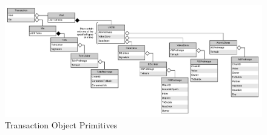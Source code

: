 \begin{figure}[H]
    \centering
    \includegraphics[scale=0.5]{figures/Transaction_Object_Primitive.pdf}
    \caption{Transaction Object Primitives}
\end{figure}
